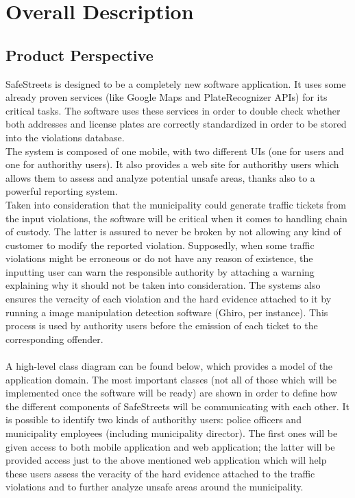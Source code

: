 \documentclass{article}
\begin{document}
\newpage
\section{Overall Description}
\subsection{Product Perspective}
SafeStreets is designed to be a completely new software application. It uses
some already proven services (like Google Maps and PlateRecognizer APIs) for its
critical tasks. The software uses these services in order to double check
whether both addresses and license plates are correctly standardized in order to
be stored into the violations database.\\
The system is composed of one mobile, with two different UIs (one for users and
one for authorithy users). It also provides a web site for authorithy users
which allows them to assess and analyze potential unsafe areas, thanks also to a
powerful reporting system.\\
Taken into consideration that the municipality could generate traffic tickets
from the input violations, the software will be critical when it comes to
handling chain of custody. The latter is assured to never be broken by not
allowing any kind of customer to modify the reported violation. Supposedly, when
some traffic violations might be erroneous or do not have any reason of
existence, the inputting user can warn the responsible authority by attaching
a warning explaining why it should not be taken into consideration. The systems
also ensures the veracity of each violation and the hard evidence attached to it
by running a image manipulation detection software (Ghiro, per instance). This
process is used by authority users before the emission of each ticket to the
corresponding offender.\\
\\
A high-level class diagram can be found below, which provides a model of the
application domain. The most important classes (not all of those which will be
implemented once the software will be ready) are shown in order to define how
the different components of SafeStreets will be communicating with each other.
It is possible to identify two kinds of authorithy users: police officers and
municipality employees (including municipality director). The first ones will be
given access to both mobile application and web application; the latter will be
provided access just to the above mentioned web application which will help
these users assess the veracity of the hard evidence attached to the traffic
violations and to further analyze unsafe areas around the municipality.\\
\end{document}
